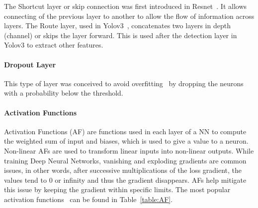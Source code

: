 \documentclass[conference]{IEEEtran}
\begin{document}
The Shortcut layer or skip connection was first introduced in
Resnet~\cite{resnet}.  It allows connecting of the previous layer to another to
allow the flow of information across layers.  The Route layer, used in
Yolov3~\cite{yolov3}, concatenates two layers in depth (channel) or skips the
layer forward. This is used after the detection layer in Yolov3 to extract other
features.

\paragraph{Dropout Layer}

This type of layer was conceived to avoid overfitting~\cite{Dropout} by dropping
the neurons with a probability below the threshold. 

\paragraph{Activation Functions}

Activation Functions (AF) are functions used in each layer of a NN
to compute the weighted sum of input and biases, which is used to give a value
to a neuron. Non-linear AFs are used to transform linear inputs into non-linear
outputs.  While training Deep Neural Networks, vanishing and exploding
gradients are common issues, in other words, after successive multiplications
of the loss gradient, the values tend to 0 or infinity and thus the
gradient disappears. AFs help mitigate this issue by keeping the gradient within
specific limits. The most popular activation functions~\cite{dubey2022activation} can be found in
Table~\ref{table:AF}.
\end{document}
